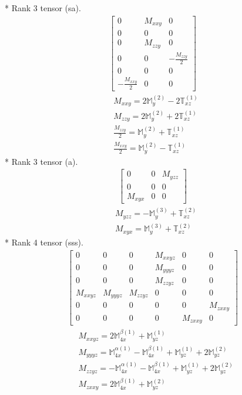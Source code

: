 \documentclass[fleqn,8pt,landscape]{jsarticle}
\begin{document}
* Rank 3 tensor (sa).
\begin{align*}
\begin{bmatrix} 0 & M_{xxy} & 0 \\ 0 & 0 & 0 \\ 0 & M_{zzy} & 0 \\ 0 & 0 & - \frac{M_{zzy}}{2} \\ 0 & 0 & 0 \\ - \frac{M_{xxy}}{2} & 0 & 0 \end{bmatrix}
\end{align*}
\begin{align*}
& M_{xxy} = 2 \mathbb{M}_{y}^{(2)} - 2 \mathbb{T}_{xz}^{(1)} \\
& M_{zzy} = 2 \mathbb{M}_{y}^{(2)} + 2 \mathbb{T}_{xz}^{(1)} \\
& \frac{M_{zzy}}{2} = \mathbb{M}_{y}^{(2)} + \mathbb{T}_{xz}^{(1)} \\
& \frac{M_{xxy}}{2} = \mathbb{M}_{y}^{(2)} - \mathbb{T}_{xz}^{(1)}
\end{align*}
* Rank 3 tensor (a).
\begin{align*}
\begin{bmatrix} 0 & 0 & M_{yzz} \\ 0 & 0 & 0 \\ M_{xyx} & 0 & 0 \end{bmatrix}
\end{align*}
\begin{align*}
& M_{yzz} = - \mathbb{M}_{y}^{(3)} + \mathbb{T}_{xz}^{(2)} \\
& M_{xyx} = \mathbb{M}_{y}^{(3)} + \mathbb{T}_{xz}^{(2)}
\end{align*}
* Rank 4 tensor (sss).
\begin{align*}
\begin{bmatrix} 0 & 0 & 0 & M_{xxyz} & 0 & 0 \\ 0 & 0 & 0 & M_{yyyz} & 0 & 0 \\ 0 & 0 & 0 & M_{zzyz} & 0 & 0 \\ M_{xxyz} & M_{yyyz} & M_{zzyz} & 0 & 0 & 0 \\ 0 & 0 & 0 & 0 & 0 & M_{zxxy} \\ 0 & 0 & 0 & 0 & M_{zxxy} & 0 \end{bmatrix}
\end{align*}
\begin{align*}
& M_{xxyz} = 2 \mathbb{M}_{4x}^{\beta(1)} + \mathbb{M}_{yz}^{(1)} \\
& M_{yyyz} = \mathbb{M}_{4x}^{\alpha(1)} - \mathbb{M}_{4x}^{\beta(1)} + \mathbb{M}_{yz}^{(1)} + 2 \mathbb{M}_{yz}^{(2)} \\
& M_{zzyz} = - \mathbb{M}_{4x}^{\alpha(1)} - \mathbb{M}_{4x}^{\beta(1)} + \mathbb{M}_{yz}^{(1)} + 2 \mathbb{M}_{yz}^{(2)} \\
& M_{zxxy} = 2 \mathbb{M}_{4x}^{\beta(1)} + \mathbb{M}_{yz}^{(2)}
\end{align*}
\end{document}
